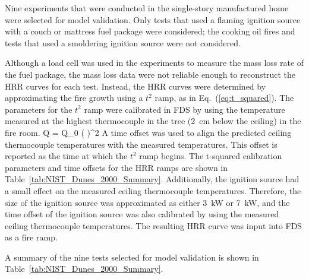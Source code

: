 Nine experiments that were conducted in the single-story manufactured home were selected for model validation.
Only tests that used a flaming ignition source with a couch or mattress fuel package were considered;
the cooking oil fires and tests that used a smoldering ignition source were not considered.

Although a load cell was used in the experiments to measure the mass loss rate of the fuel package, the mass loss data
were not reliable enough to reconstruct the HRR curves for each test. Instead, the HRR curves were determined by approximating
the fire growth using a $t^2$ ramp, as in Eq.~(\ref{eq:t_squared}). The parameters for the $t^2$ ramp were calibrated in FDS
by using the temperature measured at the highest thermocouple in the tree (2~cm below the ceiling) in the fire room.
\be
\dot Q = \dot Q_0 \left(  \right)^2
\label{eq:t_squared}
\ee
A time offset was used to align the predicted ceiling thermocouple temperatures with the measured temperatures.
This offset is reported as the time at which the $t^2$ ramp begins.
The t-squared calibration parameters and time offsets for the HRR ramps are shown in Table~\ref{tab:NIST_Dunes_2000_Summary}.
Additionally, the ignition source had a small effect on the measured ceiling thermocouple temperatures. Therefore,
the size of the ignition source was approximated as either 3~kW or 7~kW, and the time offset of the ignition source was
also calibrated by using the measured ceiling thermocouple temperatures.
The resulting HRR curve was input into FDS as a fire ramp.

A summary of the nine tests selected for model validation is shown in Table~\ref{tab:NIST_Dunes_2000_Summary}.

